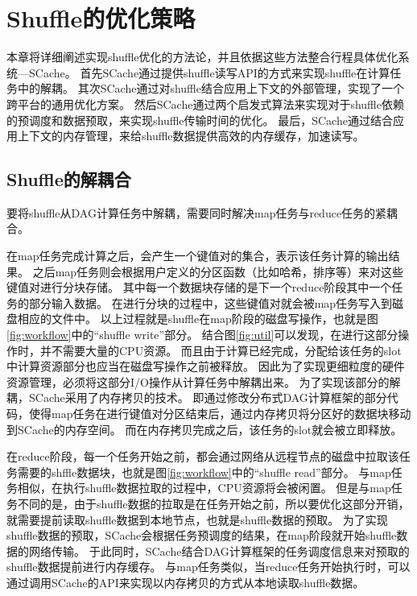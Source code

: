 
\chapter{Shuffle的优化策略}
\label{chap:optimization}

本章将详细阐述实现shuffle优化的方法论，并且依据这些方法整合行程具体优化系统---SCache。
首先SCache通过提供shuffle读写API的方式来实现shuffle在计算任务中的解耦。
其次SCache通过对shuffle结合应用上下文的外部管理，实现了一个跨平台的通用优化方案。
然后SCache通过两个启发式算法来实现对于shuffle依赖的预调度和数据预取，来实现shuffle传输时间的优化。
最后，SCache通过结合应用上下文的内存管理，来给shuffle数据提供高效的内存缓存，加速读写。

\section{Shuffle的解耦合}

要将shuffle从DAG计算任务中解耦，需要同时解决map任务与reduce任务的紧耦合。

在map任务完成计算之后，会产生一个键值对的集合，表示该任务计算的输出结果。
之后map任务则会根据用户定义的分区函数（比如哈希，排序等）来对这些键值对进行分块存储。
其中每一个数据块存储的是下一个reduce阶段其中一个任务的部分输入数据。
在进行分块的过程中，这些键值对就会被map任务写入到磁盘相应的文件中。
以上过程就是shuffle在map阶段的磁盘写操作，也就是图\ref{fig:workflow}中的“shuffle write”部分。
结合图\ref{fig:util}可以发现，在进行这部分操作时，并不需要大量的CPU资源。
而且由于计算已经完成，分配给该任务的slot中计算资源部分也应当在磁盘写操作之前被释放。
因此为了实现更细粒度的硬件资源管理，必须将这部分I/O操作从计算任务中解耦出来。
为了实现该部分的解耦，SCache采用了内存拷贝的技术。
即通过修改分布式DAG计算框架的部分代码，使得map任务在进行键值对分区结束后，通过内存拷贝将分区好的数据块移动到SCache的内存空间。
而在内存拷贝完成之后，该任务的slot就会被立即释放。

在reduce阶段，每一个任务开始之前，都会通过网络从远程节点的磁盘中拉取该任务需要的shffle数据块，也就是图\ref{fig:workflow}中的“shuffle read”部分。
与map任务相似，在执行shuffle数据拉取的过程中，CPU资源将会被闲置。
但是与map任务不同的是，由于shuffle数据的拉取是在任务开始之前，所以要优化这部分开销，就需要提前读取shuffle数据到本地节点，也就是shuffle数据的预取。
为了实现shuffle数据的预取，SCache会根据任务预调度的结果，在map阶段就开始shuffle数据的网络传输。
于此同时，SCache结合DAG计算框架的任务调度信息来对预取的shuffle数据提前进行内存缓存。
与map任务类似，当reduce任务开始执行时，可以通过调用SCache的API来实现以内存拷贝的方式从本地读取shuffle数据。

